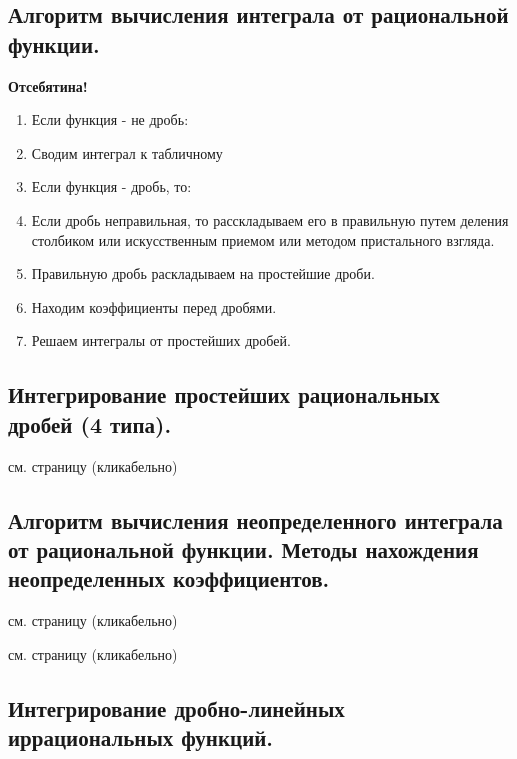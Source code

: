 \documentclass[a4paper,12pt]{article}
\theoremstyle{plain} %
\theoremstyle{definition} %
\theoremstyle{remark} %
\begin{document}
\newpage
\subsection*{Алгоритм вычисления интеграла от рациональной функции.} \label{algo_rac_int}

\textbf{Отсебятина!}

\begin{enumerate}
	\item Если функция - не дробь:
	\item Сводим интеграл к табличному
	\item Если функция - дробь, то:
	\item Если дробь неправильная, то расскладываем его в правильную путем деления столбиком или искусственным приемом или методом пристального взгляда.
	\item Правильную дробь раскладываем на простейшие дроби.
	\item Находим коэффициенты перед дробями.
	\item Решаем интегралы от простейших дробей.
\end{enumerate}



\newpage
\subsection*{Интегрирование простейших рациональных дробей (4 типа).}

см. страницу \pageref{easiest_ints} (кликабельно)

\newpage
\subsection*{Алгоритм вычисления неопределенного интеграла от рациональной функции. Методы нахождения неопределенных коэффициентов.}

см. страницу \pageref{algo_rac_int} (кликабельно)

см. страницу \pageref{methods} (кликабельно)



\newpage
\subsection*{Интегрирование дробно-линейных иррациональных функций.                                       }
\end{document}
